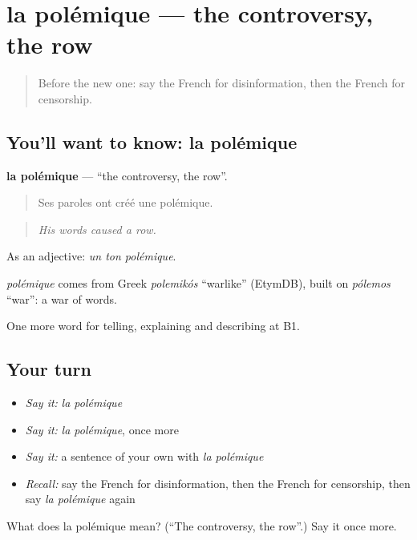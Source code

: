 \section[la polémique]{la polémique — the controversy, the row}

\label{lesson:FR-C285-polemique}



\begin{quote}
Before the new one: say the French for disinformation, then the French for censorship.
\end{quote}

\subsection*{You'll want to know: la polémique}
\textbf{la polémique} — \textquotedblleft{}the controversy, the row\textquotedblright{}.

\begin{quote}
Ses paroles ont créé une polémique.
\end{quote}

\begin{quote}
\emph{His words caused a row.}
\end{quote}

As an adjective: \emph{un ton polémique}.

\begin{cousinweb}
\emph{polémique} comes from Greek \emph{polemikós} \textquotedblleft{}warlike\textquotedblright{} (EtymDB), built on \emph{pólemos} \textquotedblleft{}war\textquotedblright{}: a war of words.
\end{cousinweb}

\begin{grammarlens}[title={What you've built}]
One more word for telling, explaining and describing at B1.
\end{grammarlens}

\subsection*{Your turn}
\begin{itemize}
\raggedright
  \item \emph{Say it:} \emph{la polémique}
  \item \emph{Say it:} \emph{la polémique}, once more
  \item \emph{Say it:} a sentence of your own with \emph{la polémique}
  \item \emph{Recall:} say the French for disinformation, then the French for censorship, then say \emph{la polémique} again
\end{itemize}

\begin{tcolorbox}[breakable,colback=teal!4,colframe=teal!35!black,title={Before you move on}]
What does la polémique mean? (\textquotedblleft{}The controversy, the row\textquotedblright{}.) Say it once more.
\end{tcolorbox}
